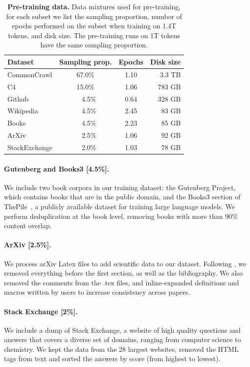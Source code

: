 \documentclass[11pt]{article}
\begin{document}
\begin{table}[t]
  \center
   \setlength{\tabcolsep}{3pt}
  \begin{tabular}{@{}l@{}ccr@{}}
  \toprule
  Dataset &  Sampling prop. & Epochs &  Disk size \\  
  \midrule
  CommonCrawl    & 67.0\%  & 1.10 & 3.3 TB \\
  C4             & 15.0\%  & 1.06 & 783 GB \\
  Github         & ~~4.5\% & 0.64 & 328 GB \\
  Wikipedia      & ~~4.5\% & 2.45 & 83 GB \\ 
  Books          & ~~4.5\% & 2.23 & 85 GB \\
  ArXiv          & ~~2.5\% & 1.06 & 92 GB \\
  StackExchange & ~~2.0\%   & 1.03 & 78 GB \\
  \bottomrule
  \end{tabular}
  \caption{\textbf{Pre-training data.} Data mixtures used for pre-training, for each subset we list the sampling proportion, number of epochs performed on the subset when training on 1.4T tokens, and disk size. The pre-training runs on 1T tokens have the same sampling proportion. 
  \label{tab:dataset}
  }
\end{table}

\paragraph{Gutenberg and Books3 [4.5\%].}
We include two book corpora in our training dataset: the Gutenberg Project, which contains books that are in the public domain, and the Books3 section of ThePile~\citep{pile}, a publicly available dataset for training large language models.
We perform deduplication at the book level, removing books with more than 90\% content overlap.

\paragraph{ArXiv [2.5\%].}
We process arXiv Latex files to add scientific data to our dataset. Following \citet{lewkowycz2022solving}, we removed everything before the first section, as well as the bibliography. We also removed the comments from the .tex files, and inline-expanded definitions and macros written by users to increase consistency across papers.

\paragraph{Stack Exchange [2\%].}
We include a dump of Stack Exchange, a website of high quality questions and answers that covers a diverse set of domains, ranging from computer science to chemistry.
We kept the data from the 28 largest websites, removed the HTML tags from text and sorted the answers by score (from highest to lowest).
\end{document}
